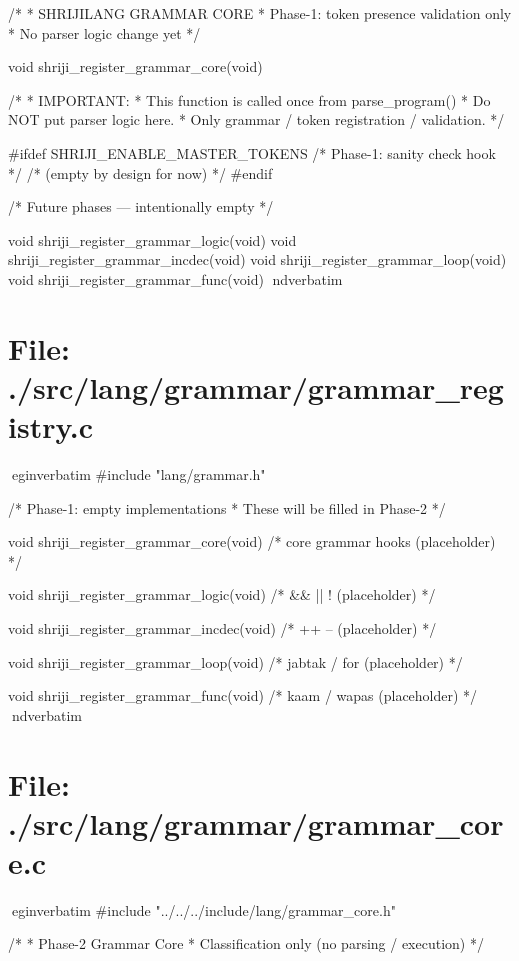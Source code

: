 \documentclass{article}
\begin{document}
/*
 * SHRIJILANG GRAMMAR CORE
 * Phase-1: token presence validation only
 * No parser logic change yet
 */

void shriji_register_grammar_core(void)
{
    /*
     * IMPORTANT:
     * This function is called once from parse_program()
     * Do NOT put parser logic here.
     * Only grammar / token registration / validation.
     */

#ifdef SHRIJI_ENABLE_MASTER_TOKENS
    /* Phase-1: sanity check hook */
    /* (empty by design for now) */
#endif
}

/* Future phases — intentionally empty */

void shriji_register_grammar_logic(void) {}
void shriji_register_grammar_incdec(void) {}
void shriji_register_grammar_loop(void) {}
void shriji_register_grammar_func(void) {}
nd{verbatim}
\section*{File: ./src/lang/grammar/grammar_registry.c}
egin{verbatim}
#include "lang/grammar.h"

/* Phase-1: empty implementations
 * These will be filled in Phase-2
 */

void shriji_register_grammar_core(void) {
    /* core grammar hooks (placeholder) */
}

void shriji_register_grammar_logic(void) {
    /* && || ! (placeholder) */
}

void shriji_register_grammar_incdec(void) {
    /* ++ -- (placeholder) */
}

void shriji_register_grammar_loop(void) {
    /* jabtak / for (placeholder) */
}

void shriji_register_grammar_func(void) {
    /* kaam / wapas (placeholder) */
}
nd{verbatim}
\section*{File: ./src/lang/grammar/grammar_core.c}
egin{verbatim}
#include "../../../include/lang/grammar_core.h"

/*
 * Phase-2 Grammar Core
 * Classification only (no parsing / execution)
 */
\end{document}

